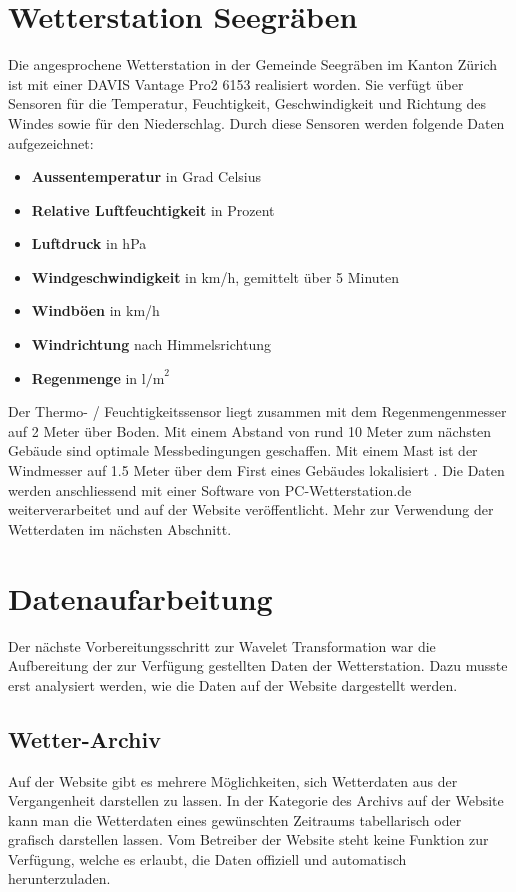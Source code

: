 \begin{refsection}
\section{Wetterstation Seegräben}

Die angesprochene Wetterstation in der Gemeinde Seegräben im Kanton Zürich ist mit einer DAVIS Vantage Pro2 6153 \cite{online:davisinstruments} realisiert worden.
Sie verfügt über Sensoren für die Temperatur, Feuchtigkeit, Geschwindigkeit und Richtung des Windes sowie für den Niederschlag. 
Durch diese Sensoren werden folgende Daten aufgezeichnet:


\begin{itemize}
	\item \textbf{Aussentemperatur} in Grad Celsius
	\item \textbf{Relative Luftfeuchtigkeit} in Prozent
	\item \textbf{Luftdruck} in hPa
	\item \textbf{Windgeschwindigkeit} in km/h, gemittelt über 5 Minuten
	\item \textbf{Windböen} in km/h
	\item \textbf{Windrichtung} nach Himmelsrichtung
	\item \textbf{Regenmenge} in $\text{l/m}^{2}$
\end{itemize}	


Der Thermo- / Feuchtigkeitssensor liegt zusammen mit dem Regenmengenmesser auf 2 Meter über Boden.
Mit einem Abstand von rund 10 Meter zum nächsten Gebäude sind optimale Messbedingungen geschaffen.
Mit einem Mast ist der Windmesser auf 1.5 Meter über dem First eines Gebäudes lokalisiert \space \cite{online:wss}.
Die Daten werden anschliessend mit einer Software von PC-Wetterstation.de weiterverarbeitet und auf der Website \cite{online:wss} veröffentlicht.
Mehr zur Verwendung der Wetterdaten im n\"achsten Abschnitt.

\section{Datenaufarbeitung}
Der n\"achste Vorbereitungsschritt zur Wavelet Transformation war die Aufbereitung der zur Verf\"ugung gestellten Daten der Wetterstation. Dazu musste erst analysiert werden, wie die Daten auf der Website dargestellt werden.
\subsection{Wetter-Archiv}
Auf der Website gibt es mehrere Möglichkeiten, sich Wetterdaten aus der Vergangenheit darstellen zu lassen.
In der Kategorie des Archivs auf der Website kann man die Wetterdaten eines gew\"unschten Zeitraums tabellarisch oder grafisch darstellen lassen.
Vom Betreiber der Website steht keine Funktion zur Verfügung, welche es erlaubt, die Daten offiziell und automatisch herunterzuladen.

\end{refsection}
